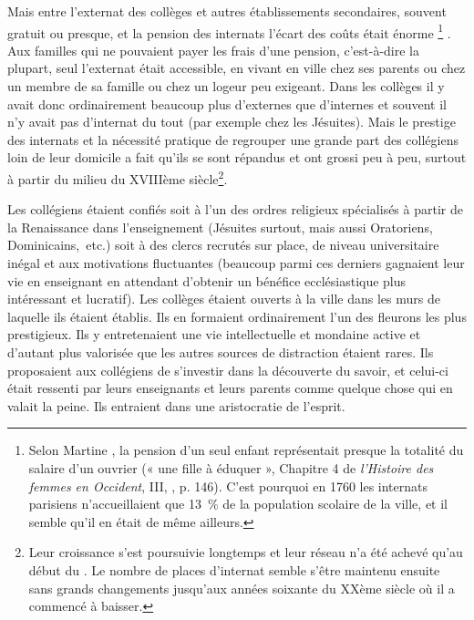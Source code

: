 Mais entre l'externat des collèges et autres établissements secondaires, souvent gratuit ou presque, et la pension des internats l'écart des coûts était énorme%
\footnote{Selon Martine , la pension d'un seul enfant représentait presque la totalité du salaire d'un ouvrier (« une fille à éduquer », Chapitre 4 de \emph{l'Histoire des femmes en Occident}, III, , p. 146). C'est pourquoi en 1760 les internats parisiens n'accueillaient que 13~\% de la population scolaire de la ville, et il semble qu'il en était de même ailleurs.}%
. Aux familles qui ne pouvaient payer les frais d'une pension, c'est-à-dire la plupart, seul l'externat était accessible, en vivant en ville chez ses parents ou chez un membre de sa famille ou chez un logeur peu exigeant. Dans les collèges il y avait donc ordinairement beaucoup plus d'externes que d'internes et souvent il n'y avait pas d'internat du tout (par exemple chez les Jésuites). Mais le prestige des internats et la nécessité pratique de regrouper une grande part des collégiens loin de leur domicile a fait qu'ils se sont répandus et ont grossi peu à peu, surtout à partir du milieu du XVIIIème siècle\footnote{Leur croissance s'est poursuivie longtemps et leur réseau n'a été achevé qu'au début du . Le nombre de places d'internat semble s'être maintenu ensuite sans grands changements jusqu'aux années soixante du XXème siècle où il a commencé à baisser.}. 

 
 

Les collégiens étaient confiés soit à l'un des ordres religieux spécialisés à partir de la Renaissance dans l'enseignement (Jésuites surtout, mais aussi Oratoriens, Dominicains,~etc.) soit à des clercs recrutés sur place, de niveau universitaire inégal et aux motivations fluctuantes (beaucoup parmi ces derniers gagnaient leur vie en enseignant en attendant d'obtenir un bénéfice ecclésiastique plus intéressant et lucratif). Les collèges étaient ouverts à la ville dans les murs de laquelle ils étaient établis. Ils en formaient ordinairement l'un des fleurons les plus prestigieux. Ils y entretenaient une vie intellectuelle et mondaine active et d'autant plus valorisée que les autres sources de distraction étaient rares. Ils proposaient aux collégiens de s'investir dans la découverte du savoir, et celui-ci était ressenti par leurs enseignants et leurs parents comme quelque chose qui en valait la peine. Ils entraient dans une aristocratie de l'esprit. 

